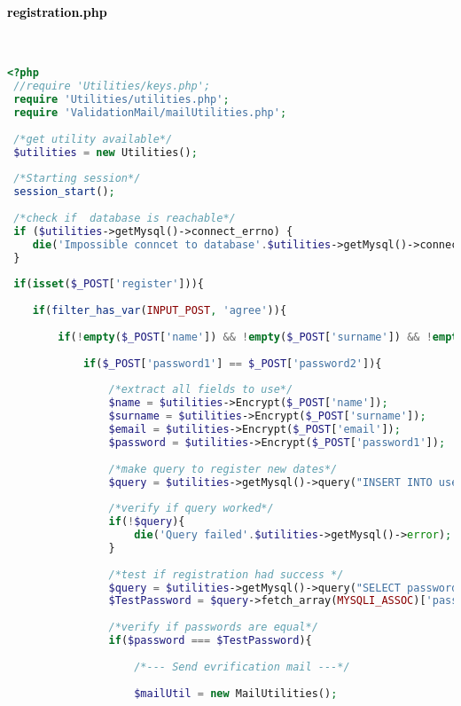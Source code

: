  \paragraph{\textcolor{black}{registration.php}}\leavevmode\\
 
 \begin{lstlisting}[language=php]
 <?php
 //require 'Utilities/keys.php';
 require 'Utilities/utilities.php';
 require 'ValidationMail/mailUtilities.php';
 
 /*get utility available*/
 $utilities = new Utilities();
 
 /*Starting session*/
 session_start();
 
 /*check if  database is reachable*/
 if ($utilities->getMysql()->connect_errno) {
 	die('Impossible conncet to database'.$utilities->getMysql()->connect_error);
 }
 
 if(isset($_POST['register'])){
 	
 	if(filter_has_var(INPUT_POST, 'agree')){
 		
 		if(!empty($_POST['name']) && !empty($_POST['surname']) && !empty($_POST['email']) && !empty($_POST['password1']) && !empty($_POST['password2'])){
 			
 			if($_POST['password1'] == $_POST['password2']){
 				
 				/*extract all fields to use*/
 				$name = $utilities->Encrypt($_POST['name']);
 				$surname = $utilities->Encrypt($_POST['surname']);
 				$email = $utilities->Encrypt($_POST['email']);
 				$password = $utilities->Encrypt($_POST['password1']);
 				
 				/*make query to register new dates*/
 				$query = $utilities->getMysql()->query("INSERT INTO user_table1 (name, surname, email, password) VALUES ('{$name}', '{$surname}', '{$email}', '{$password}')");
 				
 				/*verify if query worked*/
 				if(!$query){
 					die('Query failed'.$utilities->getMysql()->error);
 				}
 				
 				/*test if registration had success */
 				$query = $utilities->getMysql()->query("SELECT password FROM user_table1 WHERE (email = '{$email}')");
 				$TestPassword = $query->fetch_array(MYSQLI_ASSOC)['password'];
 				
 				/*verify if passwords are equal*/
 				if($password === $TestPassword){
 					
 					/*--- Send evrification mail ---*/
 					
 					$mailUtil = new MailUtilities();
 					

\end{lstlisting}
